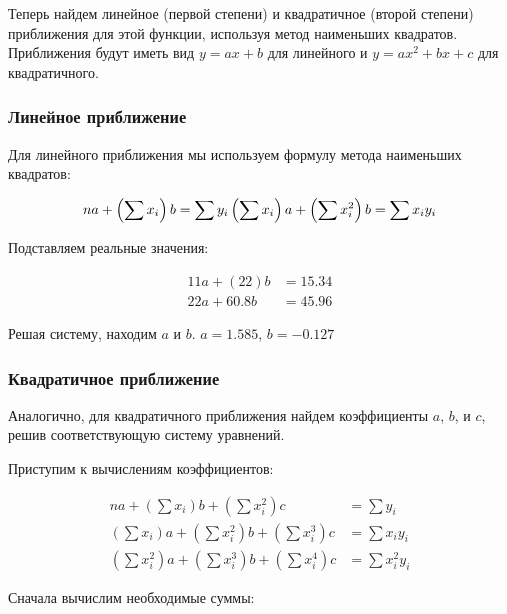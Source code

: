 \documentclass{article}
\begin{document}
            Теперь найдем линейное (первой степени) и квадратичное (второй степени) приближения для этой функции, используя метод наименьших квадратов. Приближения будут иметь вид \(y = ax + b\) для линейного и \(y = ax^2 + bx + c\) для квадратичного.

      \subsubsection{Линейное приближение}

            Для линейного приближения мы используем формулу метода наименьших квадратов:

            \[
            n a + \left(\sum x_i\right) b = \sum y_i \\
            \left(\sum x_i\right) a + \left(\sum x_i^2\right) b = \sum x_i y_i
            \]

            Подставляем реальные значения:

            \[
            \begin{aligned}
            11a + (22)b &= 15.34 \\
            22a + 60.8b &= 45.96
            \end{aligned}
            \]

            Решая систему, находим \(a\) и \(b\).
            \(a = 1.585\), \(b = -0.127\)

      \subsubsection{Квадратичное приближение}

            Аналогично, для квадратичного приближения найдем коэффициенты \(a\), \(b\), и \(c\), решив соответствующую систему уравнений.

            Приступим к вычислениям коэффициентов:


            \[
            \begin{aligned}
            n a + \left(\sum x_i\right) b + \left(\sum x_i^2\right) c &= \sum y_i \\
            \left(\sum x_i\right) a + \left(\sum x_i^2\right) b + \left(\sum x_i^3\right) c &= \sum x_i y_i \\
            \left(\sum x_i^2\right) a + \left(\sum x_i^3\right) b + \left(\sum x_i^4\right) c &= \sum x_i^2 y_i
            \end{aligned}
            \]
            
            Сначала вычислим необходимые суммы:
            
\end{document}
